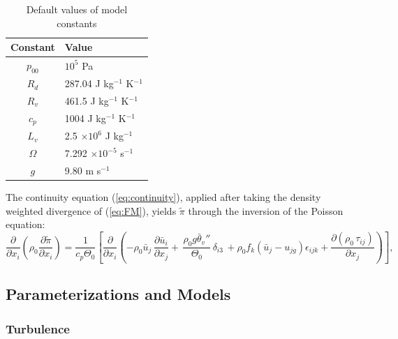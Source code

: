 \documentclass[11pt,a4paper]{article}
\begin{document}
\begin{table}[htb]
\caption{Default values of model constants} \label{tbl:constants}
\begin{center}
\begin{tabular}{cl}
Constant & Value \\ \hline \hline
$p_{00}$   & $10^5$   Pa \\
$R_d$      & 287.04 J kg$^{-1}$ K$^{-1}$ \\
$R_v$      & 461.5  J kg$^{-1}$ K$^{-1}$ \\
$c_p$      & 1004   J kg$^{-1}$ K$^{-1}$ \\
$L_v$      & 2.5 $\times 10 ^6$ J kg$^{-1}$ \\
$\Omega$   & 7.292 $\times 10 ^{-5}$ s$^{-1}$ \\
$g$        & 9.80 m s$^{-1}$ \\ \hline
\end{tabular}
\end{center}
\end{table}

The continuity equation (\ref{eq:continuity}), applied after taking
the density weighted divergence of (\ref{eq:FM}), yields $\tilde{\pi}$ through the
inversion of the Poisson equation:
\begin{equation}
\frac{\partial}{\partial x_i} \left( \rho_0 \frac{\partial
\tilde{\pi}}{\partial x_i} \right) = \frac{1}{c_p\Theta_0}
\left[\frac{\partial }{\partial x_i} \left ( - \rho_0 \bar{u}_j \,
\frac{\partial \bar{u}_i}{\partial x_j} + \, \frac{\rho_0 g
\bar{\theta}_v ''}{\Theta_0} \, \delta_{i3} \, + \rho_0 f_k (\bar{u}_j
- u_{jg}) \epsilon_{ijk} + \frac{\partial (\rho_0 \, \tau_{ij})}
{\partial x_j} \right ) \right],
\label{eq:FP}
\end{equation}

\subsection{Parameterizations and Models}

\subsubsection{Turbulence}
\end{document}
